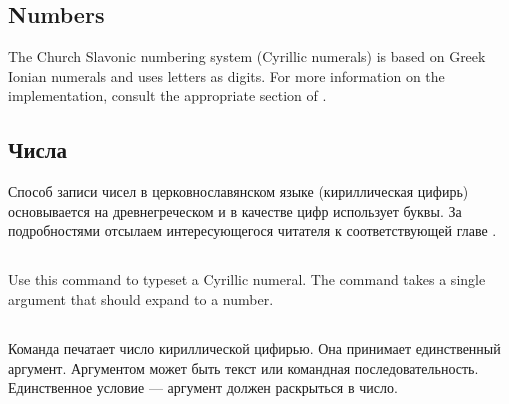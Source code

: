 \begin{EN}
\section{Numbers}

The Church Slavonic numbering system (Cyrillic numerals)
is based on Greek Ionian numerals and uses letters as digits.
For more information on the implementation, consult the appropriate section of \cite{UN41}.
\end{EN}

\begin{RU}
\section{Числа}
Способ записи чисел в церковнославянском языке (кириллическая цифирь)
основывается на древнегреческом и в
качестве цифр использует буквы. 
За подробностями отсылаем интересующегося читателя к
соответствующей главе \cite{UN41}.
\end{RU}

\begin{EN}
\subsection{}
Use this command to typeset a Cyrillic numeral.
The command takes a single argument that should expand to a number.
\end{EN}

\begin{RU}
\subsection{}
Команда печатает число кириллической цифирью.
Она принимает единственный аргумент. Аргументом может быть текст или
командная последовательность. Единственное условие --- аргумент должен раскрыться в число.
\end{RU}

